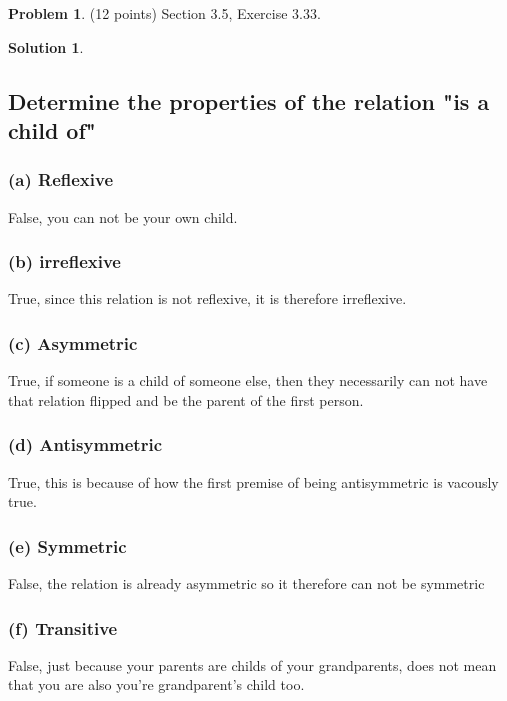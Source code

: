 \documentclass{article}
\theoremstyle{definition}
\newtheorem{problem}{Problem}
\newtheorem*{solution}{Solution}
\begin{document}
\newpage
\begin{problem} (12 points) Section 3.5, Exercise 3.33.
\end{problem}
\begin{solution}
\hspace{1cm}
\subsection*{Determine the properties of the relation "is a child of"}
\subsubsection*{(a) Reflexive}
False, you can not be your own child.
\subsubsection*{(b) irreflexive}
True, since this relation is not reflexive, it is therefore irreflexive.
\subsubsection*{(c) Asymmetric}
True, if someone is a child of someone else, then they necessarily can not have that relation flipped and be the parent of the first person.
\subsubsection*{(d) Antisymmetric}
True, this is because of how the first premise of being antisymmetric is vacously true.
\subsubsection*{(e) Symmetric}
False, the relation is already asymmetric so it therefore can not be symmetric
\subsubsection*{(f) Transitive}
False, just because your parents are childs of your grandparents, does not mean that you are also you're grandparent's child too.
\end{solution}
\end{document}
